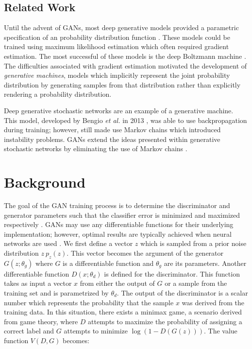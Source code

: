 \documentclass[11pt]{article}
\begin{document}
\subsection{Related Work}
Until the advent of GANs, most deep generative models provided a parametric specification of an probability distribution function \citep{2014arXiv1406.2661G}. These models could be trained using maximum likelihood estimation which often required gradient estimation. The most successful of these models is the deep Boltzmann machine \citep{2014arXiv1406.2661G}. The difficulties associated with gradient estimation motivated the development of \textit{generative machines}, models which implicitly represent the joint probability distribution by generating samples from that distribution rather than explicitly rendering a probability distribution.

Deep generative stochastic networks are an example of a generative machine. This model, developed by Bengio \textit{et al.} in 2013 \citep{2013arXiv1306.1091B}, was able to use backpropagation during training; however, still made use Markov chains which introduced instability problems. GANs extend the ideas presented within generative stochastic networks by eliminating the use of Markov chains \citep{2014arXiv1406.2661G}.



\section{Background}
The goal of the GAN training process is to determine the discriminator and generator parameters such that the classifier error is minimized and maximized respectively \citep{2017arXiv171007035C}. GANs may use any differentiable functions for their underlying implementation; however, optimal results are typically achieved when neural networks are used \citep{2014arXiv1406.2661G}. We first define a vector $z$ which is sampled from a prior noise distribution $z~p_z(z)$. This vector becomes the argument of the generator $G(z;\theta_g)$ where $G$ is a differentiable function and $\theta_g$ are its parameters. Another differentiable function $D(x;\theta_d)$ is defined for the discriminator. This function takes as input a vector $x$ from either the output of $G$ or a sample from the training set and is parametrized by $\theta_d$. The output of the discriminator is a scalar number which represents the probability that the sample $x$ was derived from the training data. In this situation, there exists a minimax game, a scenario derived from game theory, where $D$ attempts to maximize the probability of assigning a correct label and $G$ attempts to minimize $\log(1-D(G(z)))$. The value function $V(D,G)$ becomes:
\end{document}
